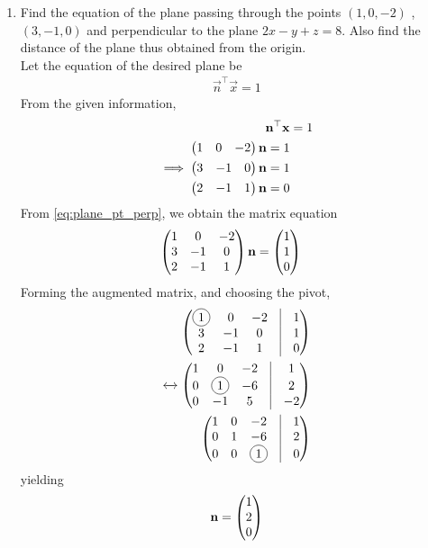 \documentclass[journal,12pt,twocolumn]{IEEEtran}
\renewcommand\thesection{\arabic{section}}
\begin{document}
\begin{enumerate}[label=\thesection.\arabic*.,ref=\thesection.\theenumi]
\item Find the equation of the plane passing through the points $(1,0,-2)$ , $(3,-1,0)$ and perpendicular to the plane $ 2x-y+z=8 $. Also find the distance of the plane thus obtained from the origin.\\
\solution Let the equation of the desired plane be 
\begin{align}
	\vec{n}^{\top}\vec{x} = 1
  \end{align}
  From the given information, 
\begin{align}
	\mathbf{n}^{\top}\mathbf{x} &= 1
	\\
\implies
\begin{split}
	\begin{pmatrix}1 &0 &-2\end{pmatrix} \mathbf{n} &=1 
	\\
	\begin{pmatrix}3 & -1 &0\end{pmatrix}\mathbf{n} &=1
	\\
	\begin{pmatrix}2 & -1 & 1\end{pmatrix}\mathbf{n} &=0
	\end{split}
	\label{eq:plane_pt_perp}
  \end{align}
From 
	\eqref{eq:plane_pt_perp},
	we obtain  the matrix equation
\begin{align}
	\begin{pmatrix}1 &0 &-2\\ 3 & -1 &0 \\ 2 & -1 & 1\end{pmatrix} \mathbf{n} &= \begin{pmatrix}1 \\ 1 \\ 0\end{pmatrix}
  \end{align}
Forming the augmented matrix, and choosing the pivot,
\begin{align}
	\myvec{\circled{1} &0 &-2 & \vrule &  1\\ 3 & -1 &0 & \vrule &1\\ 2 & -1 & 1 & \vrule &0} 
	\\
	\xleftrightarrow[]{}
	\myvec{1 &0 &-2 & \vrule &  1\\ 0 & \circled{1} &-6 & \vrule &2\\ 0 & -1 & 5 & \vrule &-2} 
	\\
	\myvec{1 &0 &-2 & \vrule &  1\\ 0 & 1 &-6 & \vrule &2\\ 0 & 0 & \circled{1} & \vrule &0} 
  \end{align}
  yielding 
\begin{align}
\vec{n} =\myvec{1 \\ 2 \\ 0} 

\end{align}
\end{enumerate}
\end{document}
